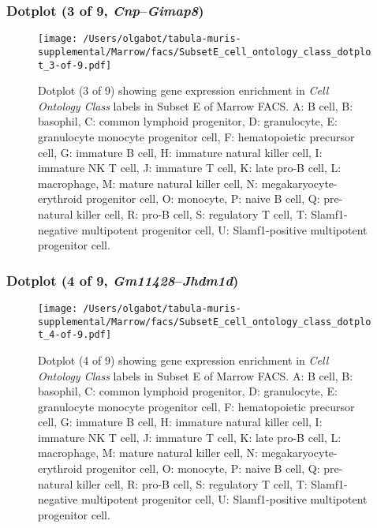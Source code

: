 \subsubsection{Dotplot (3 of 9, \emph{Cnp}--\emph{Gimap8})}
\begin{figure}[h]
\centering
\texttt{[image: /Users/olgabot/tabula-muris-supplemental/Marrow/facs/SubsetE\_cell\_ontology\_class\_dotplot\_3-of-9.pdf]}

\caption{ Dotplot (3 of 9)  showing gene expression enrichment in \emph{Cell Ontology Class} labels in Subset E of Marrow FACS. A: B cell, B: basophil, C: common lymphoid progenitor, D: granulocyte, E: granulocyte monocyte progenitor cell, F: hematopoietic precursor cell, G: immature B cell, H: immature natural killer cell, I: immature NK T cell, J: immature T cell, K: late pro-B cell, L: macrophage, M: mature natural killer cell, N: megakaryocyte-erythroid progenitor cell, O: monocyte, P: naive B cell, Q: pre-natural killer cell, R: pro-B cell, S: regulatory T cell, T: Slamf1-negative multipotent progenitor cell, U: Slamf1-positive multipotent progenitor cell.}
\end{figure}


\clearpage

\subsubsection{Dotplot (4 of 9, \emph{Gm11428}--\emph{Jhdm1d})}
\begin{figure}[h]
\centering
\texttt{[image: /Users/olgabot/tabula-muris-supplemental/Marrow/facs/SubsetE\_cell\_ontology\_class\_dotplot\_4-of-9.pdf]}

\caption{ Dotplot (4 of 9)  showing gene expression enrichment in \emph{Cell Ontology Class} labels in Subset E of Marrow FACS. A: B cell, B: basophil, C: common lymphoid progenitor, D: granulocyte, E: granulocyte monocyte progenitor cell, F: hematopoietic precursor cell, G: immature B cell, H: immature natural killer cell, I: immature NK T cell, J: immature T cell, K: late pro-B cell, L: macrophage, M: mature natural killer cell, N: megakaryocyte-erythroid progenitor cell, O: monocyte, P: naive B cell, Q: pre-natural killer cell, R: pro-B cell, S: regulatory T cell, T: Slamf1-negative multipotent progenitor cell, U: Slamf1-positive multipotent progenitor cell.}
\end{figure}


\clearpage

